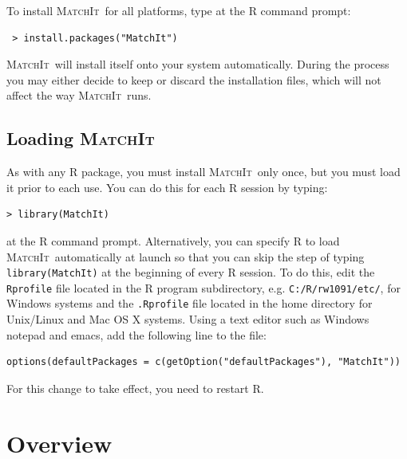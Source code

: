 \documentclass[oneside,letterpaper,titlepage]{article}
\newcommand{\MatchIt}{\textsc{MatchIt}}
\begin{document}
To install \MatchIt\ for all platforms, type at the R command prompt:
\begin{verbatim}
 > install.packages("MatchIt")
\end{verbatim}

  \noindent \MatchIt\ will install itself onto your system
  automatically.  During the process you may either decide to keep or
  discard the installation files, which will not affect the way
  \MatchIt\ runs.

\subsection{Loading \MatchIt}
As with any R package, you must install \MatchIt\ only once, but you
must load it prior to each use.  You can do this for each R session by
typing:
\begin{verbatim}
> library(MatchIt) 
\end{verbatim}
at the R command prompt.  Alternatively, you can specify R to load
\MatchIt\ automatically at launch so that you can skip the step of
typing {\tt library(MatchIt)} at the beginning of every R session.  To
do this, edit the {\tt Rprofile} file located in the R program
subdirectory, e.g. \texttt{C:/R/rw1091/etc/}, for Windows systems and
the {\tt .Rprofile} file located in the home directory for Unix/Linux
and Mac OS X systems.  Using a text editor such as Windows notepad and
emacs, add the following line to the file:
\begin{verbatim}
options(defaultPackages = c(getOption("defaultPackages"), "MatchIt"))
\end{verbatim}
For this change to take effect, you need to restart R.

%

\clearpage

\section{Overview}
\end{document}
